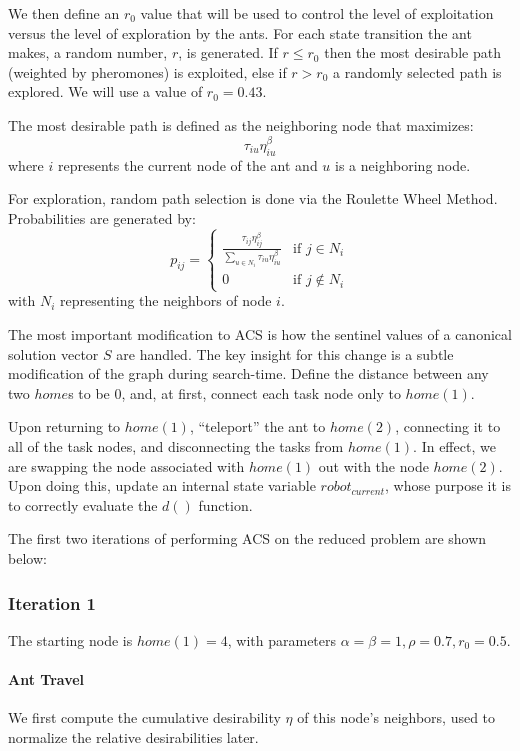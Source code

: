 \documentclass[a4paper]{article}
\newcommand{\subsubsubsection}[1]{\paragraph{#1} \mbox{}}
\begin{document}
We then define an $r_0$ value that will be used to control the level of exploitation versus the level of exploration by the ants.
For each state transition the ant makes, a random number, $r$, is generated.
If $r\leq r_0$ then the most desirable path (weighted by pheromones) is exploited, else if $r>r_0$
a randomly selected path is explored. We will use a value of $r_0=0.43$.

The most desirable path is defined as the neighboring node that maximizes:
$$
\tau_{iu}\eta_{iu}^\beta
$$
where $i$ represents the current node of the ant and $u$ is a neighboring node.

For exploration, random path selection is done via the Roulette Wheel Method.
Probabilities are generated by:
$$
p_{ij}=
\begin{cases}
\frac{\tau_{ij}\eta_{ij}^\beta}{\sum\limits_{u\in N_i} \tau_{iu}\eta_{iu}^\beta} & \text{if } j \in N_i\\
0 & \text{if } j \not\in N_i
\end{cases}
$$
with $N_i$ representing the neighbors of node $i$.

The most important modification to ACS is how the sentinel values of a canonical solution vector $S$ are handled.
The key insight for this change is a subtle modification of the graph during search-time. Define the distance between any
two $home$s to be 0, and, at first, connect each task node only to $home(1)$.

Upon returning to $\mathit{home}(1)$, ``teleport'' the ant to $\mathit{home}(2)$, connecting it to all
of the task nodes, and disconnecting the tasks from $\mathit{home}(1)$. In effect, we are swapping the node associated with $\mathit{home}(1)$ out with the node $\mathit{home}(2)$. Upon doing this, update an
internal state variable $robot_{current}$, whose purpose it is to correctly
evaluate the $d()$ function.

The first two iterations of performing ACS on the reduced problem are shown below:

\subsubsection{Iteration 1}

The starting node is $\mathit{home}(1) = 4$, with parameters $\alpha = \beta = 1, \rho = 0.7, r_0 = 0.5$.

\subsubsubsection{Ant Travel}

We first compute the cumulative desirability $\eta$ of this node's neighbors, used to normalize the relative desirabilities later.
\end{document}
